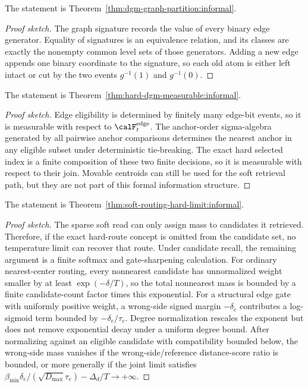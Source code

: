\begin{theorem}
\label{thm:dgm-graph-partition:sketch}
The statement is Theorem~\ref{thm:dgm-graph-partition:informal}.
\end{theorem}
\begin{proof}[Proof sketch]
The graph signature records the value of every binary edge generator. Equality of signatures is an equivalence relation, and its classes are exactly the nonempty common level sets of those generators. Adding a new edge appends one binary coordinate to the signature, so each old atom is either left intact or cut by the two events $g^{-1}(1)$ and $g^{-1}(0)$.
\end{proof}

\begin{theorem}
\label{thm:hard-dgm-measurable:sketch}
The statement is Theorem~\ref{thm:hard-dgm-measurable:informal}.
\end{theorem}
\begin{proof}[Proof sketch]
Edge eligibility is determined by finitely many edge-bit events, so it is measurable with respect to $\calF_t^{\mathrm{edge}}$. The anchor-order sigma-algebra generated by all pairwise anchor comparisons determines the nearest anchor in any eligible subset under deterministic tie-breaking. The exact hard selected index is a finite composition of these two finite decisions, so it is measurable with respect to their join. Movable centroids can still be used for the soft retrieval path, but they are not part of this formal information structure.
\end{proof}

\begin{theorem}
\label{thm:soft-routing-hard-limit:sketch}
The statement is Theorem~\ref{thm:soft-routing-hard-limit:informal}.
\end{theorem}
\begin{proof}[Proof sketch]
The sparse soft read can only assign mass to candidates it retrieved. Therefore, if the exact hard-route concept is omitted from the candidate set, no temperature limit can recover that route. Under candidate recall, the remaining argument is a finite softmax and gate-sharpening calculation.
For ordinary nearest-center routing, every nonnearest candidate has unnormalized weight smaller by at least $\exp(-\delta/T)$, so the total nonnearest mass is bounded by a finite candidate-count factor times this exponential. For a structural edge gate with uniformly positive weight, a wrong-side signed margin $-\delta_e$ contributes a log-sigmoid term bounded by $-\delta_e/\tau_e$. Degree normalization rescales the exponent but does not remove exponential decay under a uniform degree bound. After normalizing against an eligible candidate with compatibility bounded below, the wrong-side mass vanishes if the wrong-side/reference distance-score ratio is bounded, or more generally if the joint limit satisfies $\beta_{\min}\delta_e/(\sqrt{D_{\max}}\tau_e)-\Delta_d/T\to+\infty$.
\end{proof}

